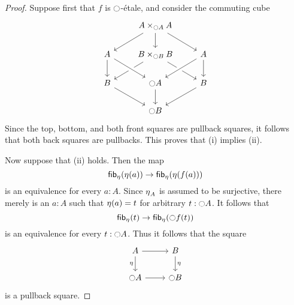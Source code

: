 \documentclass[9pt,twosided]{amsart}
\begin{document}
\begin{proof}
Suppose first that $f$ is ${\ocircle}$-\'etale, and consider the commuting cube
\begin{equation*}
\begin{tikzcd}
& A\times_{\modal A} A \arrow[dl] \arrow[d] \arrow[dr] \\
A \arrow[d] & B\times_{\modal B} B \arrow[dl] \arrow[dr] & A \arrow[dl,crossing over] \arrow[d] \\
B \arrow[dr] & \modal A \arrow[from=ul,crossing over] \arrow[d] & B \arrow[dl] \\
& \modal B
\end{tikzcd}
\end{equation*}
Since the top, bottom, and both front squares are pullback squares, it follows that both back squares are pullbacks. This proves that (i) implies (ii).

Now suppose that (ii) holds. Then the map
\begin{equation*}
\fib{\modalunit}{\modalunit(a)}\to \fib{\modalunit}{\modalunit(f(a))}
\end{equation*}
is an equivalence for every $a:A$. Since ${\eta_{}}_A$ is assumed to be surjective, there merely is an $a:A$ such that ${\eta_{}}(a)=t$ for arbitrary $t:{\ocircle} A$.
It follows that
\begin{equation*}
\fib{\modalunit}{t}\to \fib{\modalunit}{\modal f(t)}
\end{equation*}
is an equivalence for every $t:{\ocircle} A$. Thus it follows that the square
\begin{equation*}
\begin{tikzcd}
A \arrow[d,swap,"\modalunit"] \arrow[r] & B \arrow[d,"\modalunit"] \\
\modal A \arrow[r] & \modal B
\end{tikzcd}
\end{equation*}
is a pullback square.
\end{proof}
\end{document}
